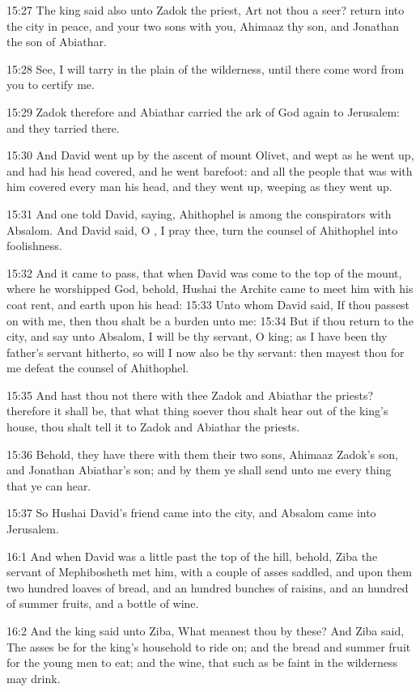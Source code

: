 15:27 The king said also unto Zadok the priest, Art not thou a seer?  return into the city in peace, and your two sons with you, Ahimaaz thy son, and Jonathan the son of Abiathar.

15:28 See, I will tarry in the plain of the wilderness, until there come word from you to certify me.

15:29 Zadok therefore and Abiathar carried the ark of God again to Jerusalem: and they tarried there.

15:30 And David went up by the ascent of mount Olivet, and wept as he went up, and had his head covered, and he went barefoot: and all the people that was with him covered every man his head, and they went up, weeping as they went up.

15:31 And one told David, saying, Ahithophel is among the conspirators with Absalom. And David said, O \LORD, I pray thee, turn the counsel of Ahithophel into foolishness.

15:32 And it came to pass, that when David was come to the top of the mount, where he worshipped God, behold, Hushai the Archite came to meet him with his coat rent, and earth upon his head: 15:33 Unto whom David said, If thou passest on with me, then thou shalt be a burden unto me: 15:34 But if thou return to the city, and say unto Absalom, I will be thy servant, O king; as I have been thy father's servant hitherto, so will I now also be thy servant: then mayest thou for me defeat the counsel of Ahithophel.

15:35 And hast thou not there with thee Zadok and Abiathar the priests?  therefore it shall be, that what thing soever thou shalt hear out of the king's house, thou shalt tell it to Zadok and Abiathar the priests.

15:36 Behold, they have there with them their two sons, Ahimaaz Zadok's son, and Jonathan Abiathar's son; and by them ye shall send unto me every thing that ye can hear.

15:37 So Hushai David's friend came into the city, and Absalom came into Jerusalem.

16:1 And when David was a little past the top of the hill, behold, Ziba the servant of Mephibosheth met him, with a couple of asses saddled, and upon them two hundred loaves of bread, and an hundred bunches of raisins, and an hundred of summer fruits, and a bottle of wine.

16:2 And the king said unto Ziba, What meanest thou by these? And Ziba said, The asses be for the king's household to ride on; and the bread and summer fruit for the young men to eat; and the wine, that such as be faint in the wilderness may drink.

